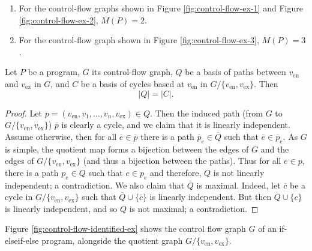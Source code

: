 \begin{example}
    \hspace{0em}
    \begin{enumerate}
        \item For the control-flow graphs shown in Figure \ref{fig:control-flow-ex-1} and Figure \ref{fig:control-flow-ex-2}, $M(P) = 2$.
        \item For the control-flow graph shown in Figure \ref{fig:control-flow-ex-3}, $M(P) = 3$.
    \end{enumerate}
\end{example}

\begin{lemma} \label{lem:bijection-paths-cycles}
    Let $P$ be a program, $G$ its control-flow graph, $Q$ be a basis of paths between $v_{\text{en}}$ and $v_{\text{ex}}$ in $G$, and $C$ be a basis of cycles based at $v_{\text{en}}$ in $G/{\{v_{\text{en}}, v_{\text{ex}}\}}$. Then
    \[ \lvert Q \rvert = \lvert C \rvert. \]
\end{lemma}

\begin{proof}
    Let $p = (v_{\text{en}}, v_1, \ldots, v_n, v_{\text{ex}}) \in Q$. Then the induced path (from $G$ to $G/{\{v_{\text{en}}, v_{\text{ex}}\}}$) $\overline p$ is clearly a cycle, and we claim that it is linearly independent. Assume otherwise, then for all $\overline e \in \overline p$ there is a path $\overline p_{\overline e} \in \overline Q$ such that $\overline e \in \overline p_{\overline e}$. As $G$ is simple, the quotient map forms a bijection between the edges of $G$ and the edges of $G/{\{v_{\text{en}}, v_{\text{ex}}\}}$ (and thus a bijection between the paths). Thus for all $e \in p$, there is a path $p_e \in Q$ such that $e \in p_e$ and therefore, $Q$ is not linearly independent; a contradiction. We also claim that $\overline Q$ is maximal. Indeed, let $\overline c$ be a cycle in $G/{\{v_{\text{en}}, v_{\text{ex}}\}}$ such that $\overline Q \cup \{\overline c\}$ is linearly independent. But then $Q \cup \{c\}$ is linearly independent, and so $Q$ is not maximal; a contradiction.
\end{proof}

Figure \ref{fig:control-flow-identified-ex} shows the control flow graph $G$ of an if-elseif-else program, alongside the quotient graph $G/\{v_{\text{en}}, v_{\text{ex}}\}$.

